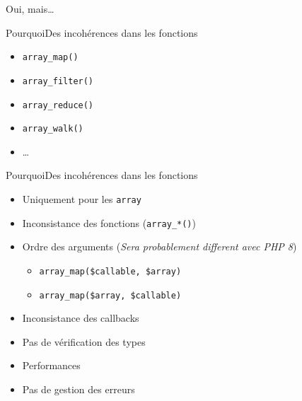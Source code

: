 \begin{frameC}{Oui, mais\ldots}

\end{frameC}

\begin{frame}{Pourquoi}{Des incohérences dans les fonctions}
    \begin{itemize}
        \item \texttt{array\_map()}
        \item \texttt{array\_filter()}
        \item \texttt{array\_reduce()}
        \item \texttt{array\_walk()}
        \item \ldots
    \end{itemize}
\end{frame}

\begin{frame}{Pourquoi}{Des incohérences dans les fonctions}
    \begin{itemize}[<+->]
        \item Uniquement pour les \texttt{array}
        \item Inconsistance des fonctions (\texttt{array\_*()})
        \item Ordre des arguments (\textit{Sera probablement different avec PHP 8})
        \begin{itemize}[<+->]
            \item \texttt{array\_map(\$callable, \$array)}
            \item \texttt{array\_map(\$array, \$callable)}
        \end{itemize}
        \item Inconsistance des callbacks
        \item Pas de vérification des types
        \item Performances
        \item Pas de gestion des erreurs
    \end{itemize}
\end{frame}

